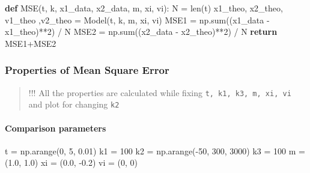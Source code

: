 \documentclass[
]{article}
\newenvironment{Shaded}{}{}
\newcommand{\BuiltInTok}[1]{\textcolor[rgb]{0.00,0.50,0.00}{#1}}
\newcommand{\ControlFlowTok}[1]{\textcolor[rgb]{0.00,0.44,0.13}{\textbf{#1}}}
\newcommand{\DecValTok}[1]{\textcolor[rgb]{0.25,0.63,0.44}{#1}}
\newcommand{\FloatTok}[1]{\textcolor[rgb]{0.25,0.63,0.44}{#1}}
\newcommand{\KeywordTok}[1]{\textcolor[rgb]{0.00,0.44,0.13}{\textbf{#1}}}
\newcommand{\NormalTok}[1]{#1}
\newcommand{\OperatorTok}[1]{\textcolor[rgb]{0.40,0.40,0.40}{#1}}
\begin{document}
\begin{Shaded}
\begin{Highlighting}[]
\KeywordTok{def}\NormalTok{ MSE(t, k, x1\_data, x2\_data, m, xi, vi):}
\NormalTok{    N }\OperatorTok{=} \BuiltInTok{len}\NormalTok{(t)}
\NormalTok{    x1\_theo, x2\_theo, v1\_theo ,v2\_theo }\OperatorTok{=}\NormalTok{ Model(t, k, m, xi, vi)}
\NormalTok{    MSE1 }\OperatorTok{=}\NormalTok{ np.}\BuiltInTok{sum}\NormalTok{((x1\_data }\OperatorTok{{-}}\NormalTok{ x1\_theo)}\OperatorTok{**}\DecValTok{2}\NormalTok{) }\OperatorTok{/}\NormalTok{ N}
\NormalTok{    MSE2 }\OperatorTok{=}\NormalTok{ np.}\BuiltInTok{sum}\NormalTok{((x2\_data }\OperatorTok{{-}}\NormalTok{ x2\_theo)}\OperatorTok{**}\DecValTok{2}\NormalTok{) }\OperatorTok{/}\NormalTok{ N}
    \ControlFlowTok{return}\NormalTok{ MSE1}\OperatorTok{+}\NormalTok{MSE2}
\end{Highlighting}
\end{Shaded}

\hypertarget{properties-of-mean-square-error}{%
\subsubsection{Properties of Mean Square
Error}\label{properties-of-mean-square-error}}

\begin{quote}
!!! All the properties are calculated while fixing
\texttt{t,\ k1,\ k3,\ m,\ xi,\ vi} and plot for changing \texttt{k2}
\end{quote}

\hypertarget{comparison-parameters}{%
\paragraph{Comparison parameters}\label{comparison-parameters}}

\begin{Shaded}
\begin{Highlighting}[]
\NormalTok{t  }\OperatorTok{=}\NormalTok{ np.arange(}\DecValTok{0}\NormalTok{, }\DecValTok{5}\NormalTok{, }\FloatTok{0.01}\NormalTok{)}
\NormalTok{k1 }\OperatorTok{=} \DecValTok{100}
\NormalTok{k2 }\OperatorTok{=}\NormalTok{ np.arange(}\OperatorTok{{-}}\DecValTok{50}\NormalTok{, }\DecValTok{300}\NormalTok{, }\DecValTok{3000}\NormalTok{)}
\NormalTok{k3 }\OperatorTok{=} \DecValTok{100}
\NormalTok{m  }\OperatorTok{=}\NormalTok{ (}\FloatTok{1.0}\NormalTok{, }\FloatTok{1.0}\NormalTok{)}
\NormalTok{xi }\OperatorTok{=}\NormalTok{ (}\FloatTok{0.0}\NormalTok{, }\OperatorTok{{-}}\FloatTok{0.2}\NormalTok{)}
\NormalTok{vi }\OperatorTok{=}\NormalTok{ (}\DecValTok{0}\NormalTok{, }\DecValTok{0}\NormalTok{)}
\end{Highlighting}
\end{Shaded}
\end{document}
